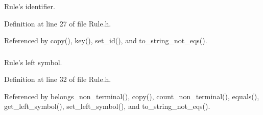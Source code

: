 \hypertarget{classgenevalmag_1_1Rule_a4dbfbae772914ba343251d7f027f48c6}{
\subsubsection[{r\_\-id}]{}}
\label{classgenevalmag_1_1Rule_a4dbfbae772914ba343251d7f027f48c6}


Rule's identifier. 



Definition at line 27 of file Rule.h.



Referenced by copy(), key(), set\_\-id(), and to\_\-string\_\-not\_\-eqs().

\hypertarget{classgenevalmag_1_1Rule_a7c56c879a7e4fdb2d35c79e061bfe862}{
\subsubsection[{r\_\-left\_\-symbol}]{}}
\label{classgenevalmag_1_1Rule_a7c56c879a7e4fdb2d35c79e061bfe862}


Rule's left symbol. 



Definition at line 32 of file Rule.h.



Referenced by belongs\_\-non\_\-terminal(), copy(), count\_\-non\_\-terminal(), equals(), get\_\-left\_\-symbol(), set\_\-left\_\-symbol(), and to\_\-string\_\-not\_\-eqs().

\hypertarget{classgenevalmag_1_1Rule_a7560aff8568cd1003d0a770729fa4873}{
\subsubsection[{r\_\-offset}]{}}
\label{classgenevalmag_1_1Rule_a7560aff8568cd1003d0a770729fa4873}


